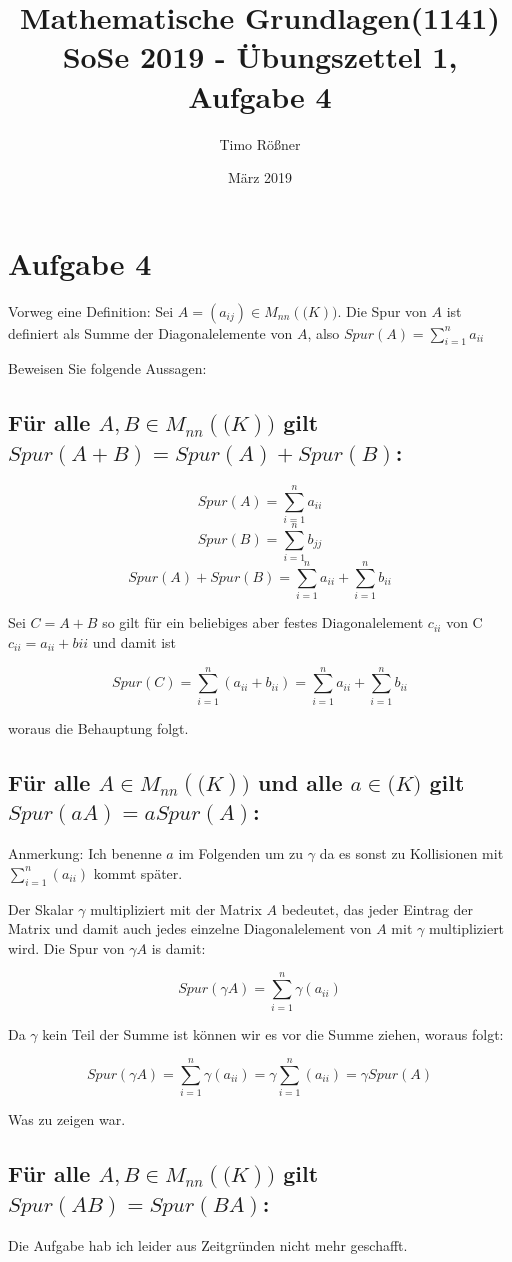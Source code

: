 \documentclass{article}
\title{Mathematische Grundlagen(1141) SoSe 2019 - Übungszettel 1, Aufgabe 4}
\author{Timo Rößner }
\date{März 2019}
\begin{document}
\maketitle

\section*{Aufgabe 4}

Vorweg eine Definition: Sei \(A = (a_{ij}) \in M_{nn}(\mathbb(K)) \). Die Spur von \(A\) ist definiert als Summe der Diagonalelemente von \(A\), also \(Spur(A) = \sum_{i = 1}^{n} a_{ii}\)

Beweisen Sie folgende Aussagen:

\subsection*{Für alle \(A, B \in M_{nn}(\mathbb(K))\) gilt \(Spur(A + B) = Spur(A) + Spur(B) \):}

\[
Spur(A) = \sum_{i = 1}^{n} a_{ii}
\]
\[
Spur(B) = \sum_{i = 1}^{n} b_{jj}
\]
\[
Spur(A) + Spur(B) = \sum_{i = 1}^{n} a_{ii} + \sum_{i = 1}^{n} b_{ii}
\]

Sei \(C = A + B\) so gilt für ein beliebiges aber festes Diagonalelement \(c_{ii}\) von C \(c_{ii} = a_{ii} + b{ii}\) und damit ist

\[
Spur(C) = \sum_{i = 1}^{n} (a_{ii} + b_{ii}) = \sum_{i = 1}^{n} a_{ii} + \sum_{i = 1}^{n} b_{ii}
\]

woraus die Behauptung folgt.

\subsection*{Für alle \(A \in M_{nn}(\mathbb(K))\) und alle \(a \in \mathbb(K)\) gilt \(Spur(aA) = a Spur(A)\):}

Anmerkung: Ich benenne \(a\) im Folgenden um zu \(\gamma\) da es sonst zu Kollisionen mit \(\sum_{i = 1}^{n} (a_{ii})\) kommt später.

Der Skalar \(\gamma\) multipliziert mit der Matrix \(A\) bedeutet, das jeder Eintrag der Matrix und damit auch jedes einzelne Diagonalelement von \(A\) mit \(\gamma\) multipliziert wird. Die Spur von \(\gamma A\) is damit:

\[
Spur(\gamma A) = \sum_{i = 1}^{n} \gamma (a_{ii})
\]

Da \(\gamma\) kein Teil der Summe ist können wir es vor die Summe ziehen, woraus folgt:

\[
Spur(\gamma A) = \sum_{i = 1}^{n} \gamma (a_{ii}) = \gamma \sum_{i = 1}^{n} (a_{ii}) = \gamma Spur(A)\]

Was zu zeigen war.

\subsection*{Für alle \(A, B \in M_{nn}(\mathbb(K))\) gilt \(Spur(AB) = Spur(BA) \):}

Die Aufgabe hab ich leider aus Zeitgründen nicht mehr geschafft.
\end{document}

